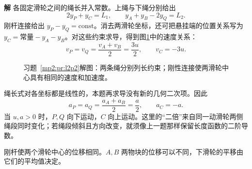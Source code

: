 \documentclass[11pt,openany,fontset=fandol]{ctexbook}
\theoremstyle{definition}\newtheorem{example}{例}[chapter]\newtheorem{exercise}{习题}[chapter]
\newcommand{\SolutionStart}{\par\medskip\ifdim\pagetotal>0pt\ifdim\dimexpr\pagegoal-\pagetotal\relax<3\baselineskip\newpage\fi\fi\noindent\textbf{解}\quad\ignorespaces}
\newenvironment{solution}{\SolutionStart}{\par\medskip}
\begin{document}
\begin{solution}
各固定滑轮之间的绳长并入常数。上绳与下绳分别给出
\[
2y_P+y_C=L_1,\qquad y_A+y_B-2y_Q=L_2.
\]
刚杆连接给出 $y_P-y_Q=\mathrm{const}$。消去两滑轮坐标，还可把悬挂端的位置关系写为 $y_C=\text{常量}-y_A-y_B$。对这些约束求导，得到图\ref{mp2:fig:l2p2-s}中的速度关系：
\[
v_P=v_Q=\frac{v_A+v_B}{2}=\frac{3u}{2},\qquad v_C=-3u.
\]

\begin{figure}[H]\centering
{}
\caption{习题~\ref{mp2:pr:l2p2}解图：两条绳分别列长约束；刚性连接使两滑轮中心具有相同的速度和加速度。}\label{mp2:fig:l2p2-s}
\end{figure}

绳长式对各坐标都是线性的，本题再求导没有新的几何二次项。因此
\[
a_P=a_Q=\frac{a_A+a_B}{2}=\frac a2,\qquad a_C=-a.
\]
当 $u,a>0$ 时，$P,Q$ 向下运动，$C$ 向上运动。这里的“二倍”来自同一动滑轮两侧绳段同时变化；若绳段倾斜且方向改变，就须像上一题那样保留长度函数的二阶导数。

刚杆使两个滑轮中心的位移相同。$A,B$ 两物块的位移可以不同，下滑轮的平移由它们的平均值决定。
\end{solution}
\end{document}
